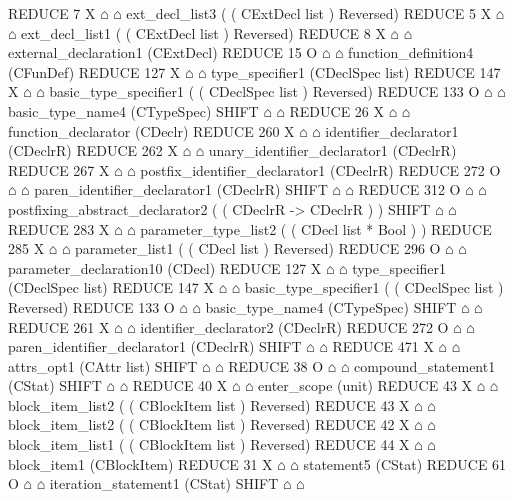 \begin{isabellebody}
\begin{isamarkuptext}
\begin{isar}
  REDUCE 7 X $\house$ $\house$ ext_decl_list3  ( ( CExtDecl list )  Reversed) 
   REDUCE 5 X $\house$ $\house$ ext_decl_list1  ( ( CExtDecl list )  Reversed) 
   REDUCE 8 X $\house$ $\house$ external_declaration1  (CExtDecl) 
    REDUCE 15 O $\house$ $\house$ function_definition4  (CFunDef) 
     REDUCE 127 X $\house$ $\house$ type_specifier1  (CDeclSpec list) 
      REDUCE 147 X $\house$ $\house$ basic_type_specifier1  ( ( CDeclSpec list )  Reversed) 
       REDUCE 133 O $\house$ $\house$ basic_type_name4  (CTypeSpec) 
        SHIFT $\house$ $\house$ 
     REDUCE 26 X $\house$ $\house$ function_declarator  (CDeclr) 
      REDUCE 260 X $\house$ $\house$ identifier_declarator1  (CDeclrR) 
       REDUCE 262 X $\house$ $\house$ unary_identifier_declarator1  (CDeclrR) 
        REDUCE 267 X $\house$ $\house$ postfix_identifier_declarator1  (CDeclrR) 
         REDUCE 272 O $\house$ $\house$ paren_identifier_declarator1  (CDeclrR) 
          SHIFT $\house$ $\house$ 
         REDUCE 312 O $\house$ $\house$ postfixing_abstract_declarator2  ( ( CDeclrR -> CDeclrR ) ) 
          SHIFT $\house$ $\house$ 
          REDUCE 283 X $\house$ $\house$ parameter_type_list2  ( ( CDecl list * Bool ) ) 
           REDUCE 285 X $\house$ $\house$ parameter_list1  ( ( CDecl list )  Reversed) 
            REDUCE 296 O $\house$ $\house$ parameter_declaration10  (CDecl) 
             REDUCE 127 X $\house$ $\house$ type_specifier1  (CDeclSpec list) 
              REDUCE 147 X $\house$ $\house$ basic_type_specifier1  ( ( CDeclSpec list )  Reversed) 
               REDUCE 133 O $\house$ $\house$ basic_type_name4  (CTypeSpec) 
                SHIFT $\house$ $\house$ 
             REDUCE 261 X $\house$ $\house$ identifier_declarator2  (CDeclrR) 
              REDUCE 272 O $\house$ $\house$ paren_identifier_declarator1  (CDeclrR) 
               SHIFT $\house$ $\house$ 
             REDUCE 471 X $\house$ $\house$ attrs_opt1  (CAttr list) 
          SHIFT $\house$ $\house$ 
     REDUCE 38 O $\house$ $\house$ compound_statement1  (CStat) 
      SHIFT $\house$ $\house$ 
      REDUCE 40 X $\house$ $\house$ enter_scope  (unit) 
      REDUCE 43 X $\house$ $\house$ block_item_list2  ( ( CBlockItem list )  Reversed) 
       REDUCE 43 X $\house$ $\house$ block_item_list2  ( ( CBlockItem list )  Reversed) 
        REDUCE 42 X $\house$ $\house$ block_item_list1  ( ( CBlockItem list )  Reversed) 
        REDUCE 44 X $\house$ $\house$ block_item1  (CBlockItem) 
         REDUCE 31 X $\house$ $\house$ statement5  (CStat) 
          REDUCE 61 O $\house$ $\house$ iteration_statement1  (CStat) 
           SHIFT $\house$ $\house$ 

\end{isar}
\end{isamarkuptext}
\end{isabellebody}
